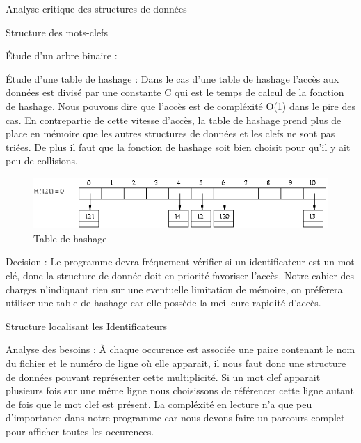 \documentclass{article}
\begin{document}
\begin{section}{Analyse critique des structures de données}
\begin{subsection}{Structure des mots-clefs}
\begin{paragraph}{Étude d'un arbre binaire :}
    \end{paragraph}
    
    \begin{paragraph}{Étude d'une table de hashage :}
     Dans le cas d'une table de hashage l'accès aux données est divisé par une constante C qui est le temps de calcul de la fonction de hashage.
     Nous pouvons dire que l'accès est de compléxité O(1) dans le pire des cas. En contrepartie de cette vitesse d'accès, la table de hashage
     prend plus de place en mémoire que les autres structures de données et les clefs ne sont pas triées. De plus il faut que la fonction de
     hashage soit bien choisit pour qu'il y ait peu de collisions.
     
    \begin{figure}[htp]
    \centering
    \includegraphics[scale=0.5]{images/hashtable.png}
    \caption{Table de hashage}
    \end{figure}

    \end{paragraph}
    \begin{paragraph}{Decision :}
	Le programme devra fréquement vérifier si un identificateur est un mot clé, donc la structure de donnée doit en priorité favoriser l'accès.
	Notre cahier des charges n'indiquant rien sur une eventuelle limitation de mémoire, on préfèrera utiliser une table de hashage car elle possède la meilleure rapidité d'accès.
    \end{paragraph}

  \end{subsection}

  \begin{subsection}{Structure localisant les Identificateurs}
    \begin{paragraph}{Analyse des besoins :}
    À chaque occurence est associée une paire contenant le nom du fichier et le numéro de ligne où elle apparait, il nous faut donc une structure de données pouvant représenter
    cette multiplicité. Si un mot clef apparait plusieurs fois sur une même ligne nous choisissons de référencer cette ligne autant de fois que le mot clef est présent.
    La compléxité en lecture n'a que peu d'importance dans notre programme car nous devons faire un parcours complet pour afficher toutes les occurences.
    

\end{paragraph}
\end{subsection}
\end{section}
\end{document}
